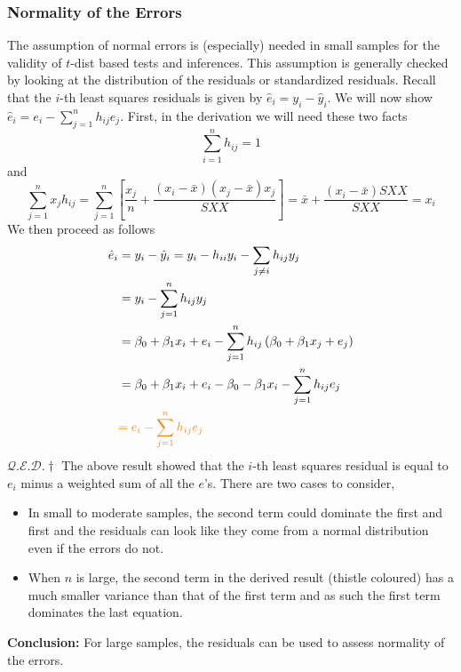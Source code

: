 \documentclass[10pt]{article}
\newcommand{\qed}{\hfill $\mathcal{Q}.\mathcal{E}.\mathcal{D}.\dagger$}
\begin{document}
\subsubsection{Normality of the Errors}
The assumption of normal errors is (especially) needed in small samples for the validity of $t$-dist based tests and inferences. This assumption is generally checked by looking at the distribution of the residuals or standardized residuals. Recall that the $i$-th least squares residuals is given by $\hat{e}_{i}=y_{i}-\hat{y}_{i}$. We will now show $\hat{e}_{i}=e_{i}-\sum_{j=1}^{n} h_{i j} e_{j}$. First, in the derivation we will need these two facts
\begin{equation*}
    \sum_{i=1}^{n} h_{i j}=1
\end{equation*}
and 
\begin{equation*}
    \sum_{j=1}^{n} x_{j} h_{i j}=\sum_{j=1}^{n}\left[\frac{x_{j}}{n}+\frac{\left(x_{i}-\bar{x}\right)\left(x_{j}-\bar{x}\right) x_{j}}{S X X}\right]=\bar{x}+\frac{\left(x_{i}-\bar{x}\right) S X X}{S X X}=x_{i}
\end{equation*}
We then proceed as follows
\begin{align*} 
    \hat{e}_{i} &=y_{i}-\hat{y}_{i} =y_{i}-h_{i i} y_{i}-\sum_{j \neq i} h_{i j} y_{j} \\ 
    &=y_{i}-\sum_{j=1}^{n} h_{i j} y_{j} \\ 
    &=\beta_{0}+\beta_{1} x_{i}+e_{i}-\sum_{j=1}^{n} h_{i j}\left(\beta_{0}+\beta_{1} x_{j}+e_{j}\right) \\ 
    &=\beta_{0}+\beta_{1} x_{i}+e_{i}-\beta_{0}-\beta_{1} x_{i}-\sum_{j=1}^{n} h_{i j} e_{j} \\ 
    &\color{BurntOrange}{=e_{i}-\sum_{j=1}^{n} h_{i j} e_{j}}
\end{align*}
\hfill \qed \newline
The above result showed that the $i$-th least squares residual is equal to $e_i$ minus a weighted sum of all the $e$'s. There are two cases to consider,
\begin{itemize}
    \item In small to moderate samples, the second term could dominate the first and first and the residuals can look like they come from a normal distribution even if the errors do not. 
    \item When $n$ is large, the second term in the derived result (thistle coloured) has a much smaller variance than that of the first term and as such the first term dominates the last equation. 
\end{itemize}
\textbf{Conclusion:} For large samples, the residuals can be used to assess normality of the errors.
\end{document}
